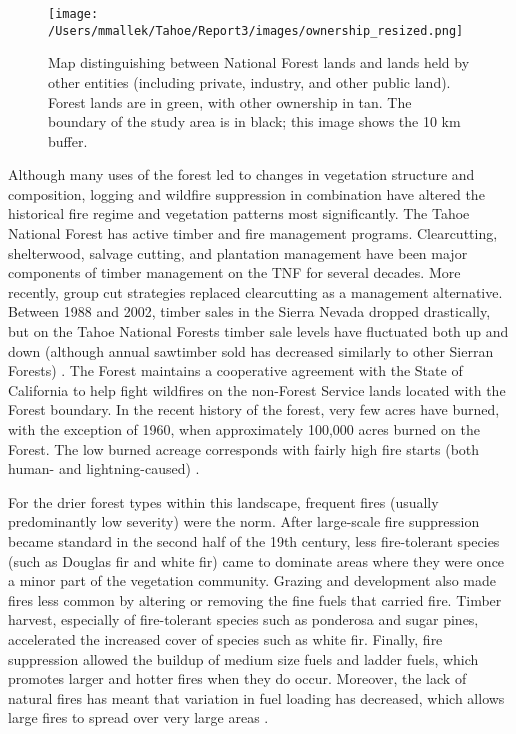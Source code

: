 \begin{figure}[!htbp]
\centering
\texttt{[image: /Users/mmallek/Tahoe/Report3/images/ownership\_resized.png]}
\caption{Map distinguishing between National Forest lands and lands held by other entities (including private, industry, and other public land). Forest lands are in green, with other ownership in tan. The boundary of the study area is in black; this image shows the 10 km buffer.} 
\label{ownership}
\end{figure}

Although many uses of the forest led to changes in vegetation structure and composition, logging and wildfire suppression in combination have altered the historical fire regime and vegetation patterns most significantly. The Tahoe National Forest has active timber and fire management programs. Clearcutting, shelterwood, salvage cutting, and plantation management have been major components of timber management on the TNF for several decades. More recently, group cut strategies replaced clearcutting as a management alternative. Between 1988 and 2002, timber sales in the Sierra Nevada dropped drastically, but on the Tahoe National Forests timber sale levels have fluctuated both up and down (although annual sawtimber sold has decreased similarly to other Sierran Forests) \citep{USDAForestService2004}. The Forest maintains a cooperative agreement with the State of California to help fight wildfires on the non-Forest Service lands located with the Forest boundary. In the recent history of the forest, very few acres have burned, with the exception of 1960, when approximately 100,000 acres burned on the Forest. The low burned acreage corresponds with fairly high fire starts (both human- and lightning-caused) \citep{USDAForestService1990}.

For the drier forest types within this landscape, frequent fires (usually predominantly low severity) were the norm. After large-scale fire suppression became standard in the second half of the 19th century, less fire-tolerant species (such as Douglas fir and white fir) came to dominate areas where they were once a minor part of the vegetation community. Grazing and development also made fires less common by altering or removing the fine fuels that carried fire. Timber harvest, especially of fire-tolerant species such as ponderosa and sugar pines, accelerated the increased cover of species such as white fir. Finally, fire suppression allowed the buildup of medium size fuels and ladder fuels, which promotes larger and hotter fires when they do occur. Moreover, the lack of natural fires has meant that variation in fuel loading has decreased, which allows large fires to spread over very large areas \citep{Hessburg2005,Stephens2015,Knapp2013}.


